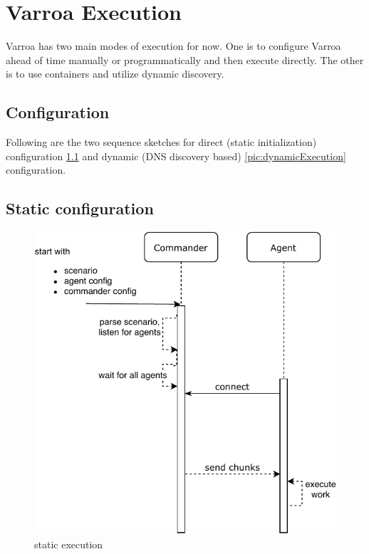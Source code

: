 \chapter{Varroa Execution}

Varroa has two main modes of execution for now. One is to configure Varroa ahead of time manually or programmatically and then execute directly. The other is to use containers and utilize dynamic discovery.

\section{Configuration}
Following are the two sequence sketches for direct (static initialization) configuration \ref{pic:staticExecution} and dynamic (DNS discovery based) \ref{pic:dynamicExecution} configuration.

\section{Static configuration}
\begin{figure}[h]
\begin{center}
\includegraphics[scale=0.65]{Resources/PDF/ExecutionStaticInit}
\caption{static execution}
\label{pic:staticExecution}
\end{center}
\end{figure}

